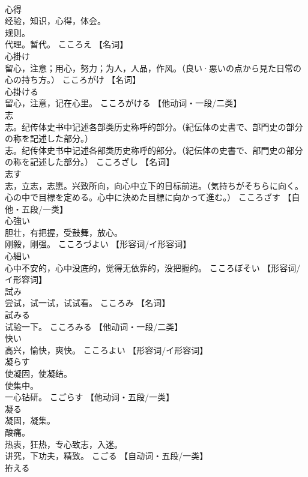 \documentclass[8pt]{extreport}
\begin{document}
\begin{CJK}{UTF8}{min}
\\	心得	
\\	经验，知识，心得，体会。 
\\	规则。 
\\	代理。暂代。	こころえ		【名词】
\\	心掛け	
\\	留心，注意；用心，努力；为人，人品，作风。（良い·悪いの点から見た日常の心の持ち方。）	こころがけ		【名词】
\\	心掛ける	
\\	留心，注意，记在心里。	こころがける		【他动词・一段/二类】
\\	志	
\\	志。纪传体史书中记述各部类历史称呼的部分。（紀伝体の史書で、部門史の部分の称を記述した部分。） 
\\	志。纪传体史书中记述各部类历史称呼的部分。（紀伝体の史書で、部門史の部分の称を記述した部分。）	こころざし		【名词】
\\	志す	
\\	志，立志，志愿。兴致所向，向心中立下的目标前进。（気持ちがそちらに向く。心の中で目標を定める。心中に決めた目標に向かって進む。）	こころざす		【自他・五段/一类】
\\	心強い	
\\	胆壮，有把握，受鼓舞，放心。 
\\	刚毅，刚强。	こころづよい		【形容词/イ形容词】
\\	心細い	
\\	心中不安的，心中没底的，觉得无依靠的，没把握的。	こころぼそい		【形容词/イ形容词】
\\	試み	
\\	尝试，试一试，试试看。	こころみ		【名词】
\\	試みる	
\\	试验一下。	こころみる		【他动词・一段/二类】
\\	快い	
\\	高兴，愉快，爽快。	こころよい		【形容词/イ形容词】
\\	凝らす	
\\	使凝固，使凝结。 
\\	使集中。 
\\	一心钻研。	こごらす		【他动词・五段/一类】
\\	凝る	
\\	凝固，凝集。 
\\	酸痛。 
\\	热衷，狂热，专心致志，入迷。 
\\	讲究，下功夫，精致。	こごる		【自动词・五段/一类】
\\	拵える	

\end{CJK}
\end{document}
